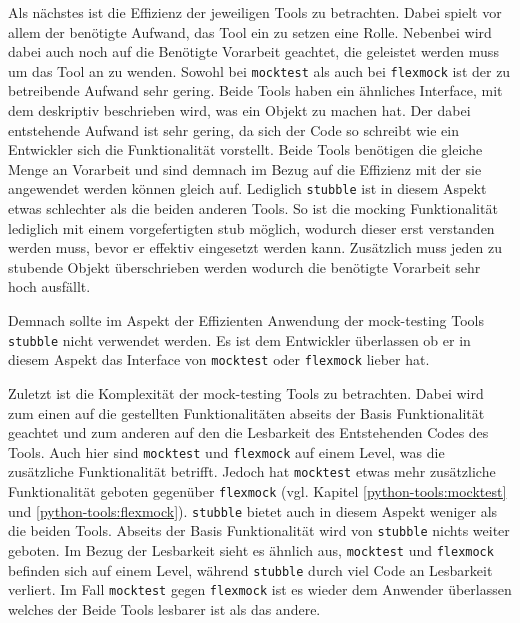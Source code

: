 Als nächstes ist die Effizienz der jeweiligen Tools zu betrachten. Dabei spielt
vor allem der benötigte Aufwand, das Tool ein zu setzen eine Rolle. Nebenbei
wird dabei auch noch auf die Benötigte Vorarbeit geachtet, die geleistet werden
muss um das Tool an zu wenden. Sowohl bei \lstinline{mocktest} als auch bei
\lstinline{flexmock} ist der zu betreibende Aufwand sehr gering. Beide Tools
haben ein ähnliches Interface, mit dem deskriptiv beschrieben wird, was ein
Objekt zu machen hat. Der dabei entstehende Aufwand ist sehr gering, da sich
der Code so schreibt wie ein Entwickler sich die Funktionalität vorstellt.
Beide Tools benötigen die gleiche Menge an Vorarbeit und sind demnach im Bezug
auf die Effizienz mit der sie angewendet werden können gleich auf. Lediglich
\lstinline{stubble} ist in diesem Aspekt etwas schlechter als die beiden
anderen Tools. So ist die \gls{mock}ing Funktionalität lediglich mit einem
vorgefertigten \Gls{stub} möglich, wodurch dieser erst verstanden werden muss,
bevor er effektiv eingesetzt werden kann. Zusätzlich muss jeden zu
\gls{stub}ende Objekt überschrieben werden wodurch die benötigte Vorarbeit sehr 
hoch ausfällt.

Demnach sollte im Aspekt der Effizienten Anwendung der
\gls{mock}-testing Tools \lstinline{stubble} nicht verwendet werden. Es ist dem
Entwickler überlassen ob er in diesem Aspekt das Interface von
\lstinline{mocktest} oder \lstinline{flexmock} lieber hat.
\newline

Zuletzt ist die Komplexität der \gls{mock}-testing Tools zu betrachten. Dabei
wird zum einen auf die gestellten Funktionalitäten abseits der Basis
Funktionalität geachtet und zum anderen auf den die Lesbarkeit des Entstehenden
Codes des Tools. Auch hier sind \lstinline{mocktest} und \lstinline{flexmock}
auf einem Level, was die zusätzliche Funktionalität betrifft. Jedoch hat
\lstinline{mocktest} etwas mehr zusätzliche Funktionalität geboten gegenüber
\lstinline{flexmock} (vgl. Kapitel \ref{python-tools:mocktest} und
\ref{python-tools:flexmock}). \lstinline{stubble} bietet auch in diesem Aspekt
weniger als die beiden Tools. Abseits der Basis Funktionalität wird von
\lstinline{stubble} nichts weiter geboten. Im Bezug der Lesbarkeit sieht es
ähnlich aus, \lstinline{mocktest} und \lstinline{flexmock} befinden sich auf
einem Level, während \lstinline{stubble} durch viel Code an Lesbarkeit
verliert. Im Fall \lstinline{mocktest} gegen \lstinline{flexmock} ist es wieder
dem Anwender überlassen welches der Beide Tools lesbarer ist als das andere.


